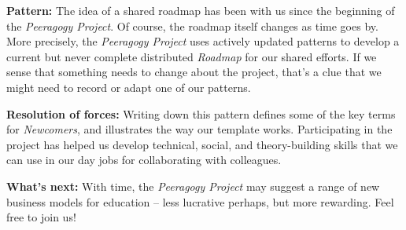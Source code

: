 \textbf{Pattern:}
The idea of a shared roadmap has been with us since the beginning of the \emph{Peeragogy Project}.  Of course, the roadmap itself changes as time goes by.  More precisely, the \emph{Peeragogy Project} uses actively updated patterns to develop a current but never complete distributed \emph{Roadmap} for our shared efforts.  If we sense that something needs to  change about the project, that’s a clue that we might need to record or adapt one of our patterns. 

\textbf{Resolution of forces:}  
Writing down this pattern defines some of the key terms for \emph{Newcomers}, and illustrates the way our template works.  Participating in the project has helped us develop technical, social, and theory-building skills that we can use in our day jobs for collaborating with colleagues.

\textbf{What's next:} 
With time, the \emph{Peeragogy Project} may suggest a range of new business models for education -- less lucrative perhaps, but more rewarding.  Feel free to join us!